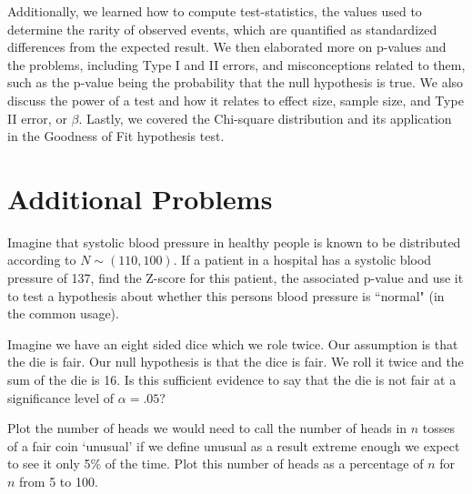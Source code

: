 Additionally, we learned how to compute test-statistics, the values used to determine the rarity of observed events, which are quantified as standardized differences from the expected result. We then elaborated more on p-values and the problems, including Type I and II errors, and misconceptions related to them, such as the p-value being the probability that the null hypothesis is true. We also discuss the power of a test and how it relates to effect size, sample size, and Type II error, or $\beta$. Lastly, we covered the Chi-square distribution and its application in the Goodness of Fit hypothesis test.




\section{Additional Problems}

\begin{exe} Imagine that systolic blood pressure in healthy people  is known to be distributed according to $N \sim (110,100)$. If a patient in a hospital has a systolic blood pressure of 137, find the Z-score for this patient, the associated p-value and use it to test a hypothesis about whether this persons blood pressure is ``normal" (in the common usage). \end{exe}

\begin{exe} Imagine we have an eight sided dice which we role twice. Our assumption is that the die is fair.  Our null hypothesis is that the dice is fair.  We roll it twice and the sum of the die is 16. Is this sufficient evidence to say that the die is not fair at a significance level of $\alpha=.05$? \end{exe}


\begin{exe} Plot the number of heads we would need to call the number of heads in $n$ tosses of a fair coin `unusual' if we define unusual as a result extreme enough we expect to see it only 5\% of the time.  Plot this number of heads as a percentage of $n$ for $n$ from 5 to 100. \end{exe}

